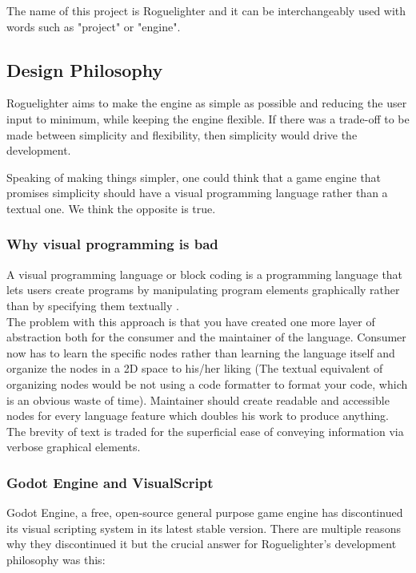 \documentclass{article}
\begin{document}
The name of this project is Roguelighter and it can be interchangeably used with words such as "project" or "engine". 

\subsection{Design Philosophy}
Roguelighter aims to make the engine as simple as possible and reducing the user input to minimum, while keeping the engine flexible. If there was a trade-off to be made between simplicity and flexibility, then simplicity would drive the development. 

Speaking of making things simpler, one could think that a game engine that promises simplicity should have a visual programming language rather than a textual one. We think the opposite is true.

\subsubsection{Why visual programming is bad}\label{visual-programming}
A visual programming language or block coding is a programming language that lets users create programs by manipulating program elements graphically rather than by specifying them textually \cite{visual-programming}.\\

The problem with this approach is that you have created one more layer of abstraction both for the consumer and the maintainer of the language. Consumer now has to learn the specific nodes rather than learning the language itself and organize the nodes in a 2D space to his/her liking (The textual equivalent of organizing nodes would be not using a code formatter to format your code, which is an obvious waste of time). Maintainer should create readable and accessible nodes for every language feature which doubles his work to produce anything. The brevity of text is traded for the superficial ease of conveying information via verbose graphical elements. 

\subsubsection{Godot Engine and VisualScript}
Godot Engine, a free, open-source general purpose game engine has discontinued its visual scripting system in its latest stable version. There are multiple reasons why they discontinued it but the crucial answer for Roguelighter's development philosophy was this:\\
\end{document}
